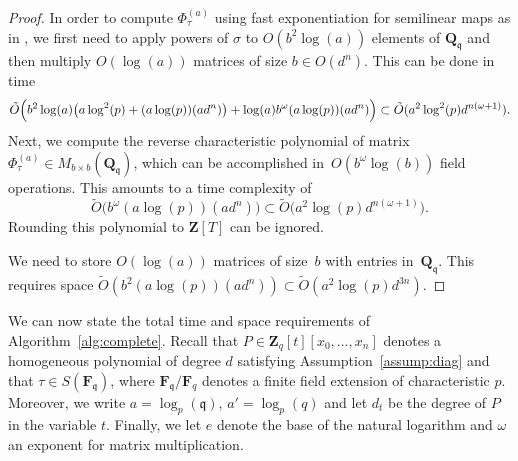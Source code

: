 \documentclass[a4paper,11pt]{article}
\numberwithin{equation}{section}
\newcommand{\ZZ}{\mathbf{Z}} %
\newcommand{\QQ}{\mathbf{Q}} %
\newcommand{\FF}{\mathbf{F}} %
\providecommand{\BigOh}{O}          %
\providecommand{\SoftOh}{\tilde{O}} %
\theoremstyle{definition}
\begin{document}
\begin{proof}
In order to compute $\Phi_{\tau}^{(a)}$ using fast exponentiation for 
semilinear maps as in \citep[Lemma 32]{LauderWan2008}, we first need to apply powers of $\sigma$ to $\BigOh(b^2 \log(a))$ 
elements of $\QQ_{\mathfrak{q}}$ and then multiply $\BigOh(\log (a))$ matrices 
of size $b \in \BigOh(d^n)$. This can be done in time 
\begin{gather*}
\SoftOh\Bigl( b^2 \log(a) \bigl( a \log^2(p) + (a \log(p))(a d^n)  \bigr) 
    + \log(a) b^{\omega} (a \log(p))(a d^n)  \Bigr) 
\subset \SoftOh(a^2 \log^2(p) d^{n(\omega+1)}).
\end{gather*}
Next, we compute the reverse characteristic polynomial of matrix 
$\Phi_{\tau}^{(a)} \in M_{b \times b}(\QQ_{\mathfrak{q}})$, which 
can be accomplished in~$\BigOh(b^{\omega} \log(b))$ field operations. 
This amounts to a time complexity of 
\begin{equation*}
\SoftOh\bigl(b^{\omega} (a \log(p))(a d^n) \bigr)
    \subset \SoftOh\bigl( a^2 \log(p) d^{n(\omega+1)} \bigr).
\end{equation*}
Rounding this polynomial to $\ZZ[T]$ can be ignored.

We need to store $\BigOh(\log(a))$ matrices of size~$b$ with entries 
in~$\QQ_{\mathfrak{q}}$.  This requires space 
$\SoftOh(b^2 (a \log(p)) (a d^n)) \subset \SoftOh(a^2 \log(p) d^{3n})$.
\end{proof}

We can now state the total time and space requirements of 
Algorithm~\ref{alg:complete}. Recall that $P \in \ZZ_q[t][x_0,\dotsc,x_n]$ 
denotes a homogeneous polynomial
of degree $d$ satisfying Assumption~\ref{assump:diag} 
and that $\tau \in S(\mathbf{F}_{\mathfrak{q}})$, where 
$\FF_{\mathfrak{q}}/\FF_q$ denotes a finite field extension
of characteristic $p$. 
Moreover, we write $a=\log_p(\mathfrak{q})$, $a'=\log_p(q)$ and let
$d_t$ be the degree of $P$ in the variable $t$. Finally,
we let $e$ denote the base of the natural
logarithm and $\omega$ an exponent for matrix multiplication.
\end{document}
